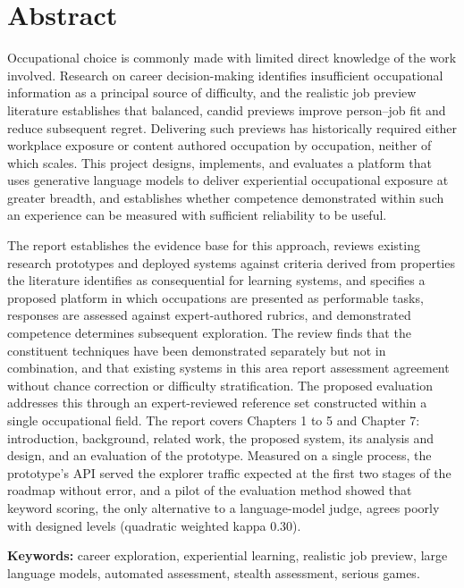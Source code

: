\section*{Abstract}

Occupational choice is commonly made with limited direct knowledge of the work involved. Research on career decision-\allowbreak{}making identifies insufficient occupational information as a principal source of difficulty, and the realistic job preview literature establishes that balanced, candid previews improve person--job fit and reduce subsequent regret. Delivering such previews has historically required either workplace exposure or content authored occupation by occupation, neither of which scales. This project designs, implements, and evaluates a platform that uses generative language models to deliver experiential occupational exposure at greater breadth, and establishes whether competence demonstrated within such an experience can be measured with sufficient reliability to be useful.

The report establishes the evidence base for this approach, reviews existing research prototypes and deployed systems against criteria derived from properties the literature identifies as consequential for learning systems, and specifies a proposed platform in which occupations are presented as performable tasks, responses are assessed against expert-\allowbreak{}authored rubrics, and demonstrated competence determines subsequent exploration. The review finds that the constituent techniques have been demonstrated separately but not in combination, and that existing systems in this area report assessment agreement without chance correction or difficulty stratification. The proposed evaluation addresses this through an expert-\allowbreak{}reviewed reference set constructed within a single occupational field. The report covers Chapters 1 to 5 and Chapter 7: introduction, background, related work, the proposed system, its analysis and design, and an evaluation of the prototype. Measured on a single process, the prototype's API served the explorer traffic expected at the first two stages of the roadmap without error, and a pilot of the evaluation method showed that keyword scoring, the only alternative to a language-\allowbreak{}model judge, agrees poorly with designed levels (quadratic weighted kappa 0.30).

\textbf{Keywords:} career exploration, experiential learning, realistic job preview, large language models, automated assessment, stealth assessment, serious games.

